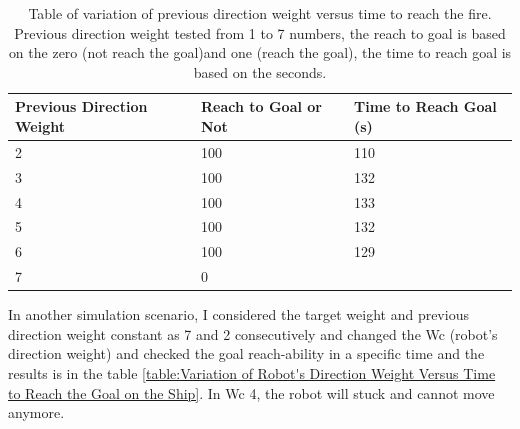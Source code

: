 \begin{table}[ht!]
\centering
    \begin{tabular}{ m{3cm} m{5cm} m{5cm} } 
    \toprule
    \toprule
    \textbf{Previous Direction Weight} & \textbf{Reach to Goal or Not} & \textbf{Time to Reach Goal (s)} \\
    \midrule
    2      & 100       & 110   \\[1.3ex]
    3      & 100     & 132   \\[1.3ex]
    4      & 100     & 133   \\[1.3ex]
    5      & 100    & 132   \\[1.3ex]
    6     & 100     & 129     \\[1.3ex]
    7     & 0     &      \\[1.3ex]
 
    \bottomrule
    \bottomrule
\end{tabular}
\caption[Variation of Previous Direction Weight Versus Time to Reach the fire on a Ship's Deck]{Table of variation of previous direction weight versus time to reach the fire. Previous direction weight tested from 1 to 7 numbers, the reach to goal is based on the zero (not reach the goal)and one (reach the goal), the time to reach goal is based on the seconds. }
\label{table:Variation of Previous Direction Weight Versus Time to Reach the Goal on the Ship}
\end{table} 
\noindent In another simulation scenario, I considered the target weight and previous direction weight constant as 7 and 2 consecutively and changed the Wc (robot's direction weight) and checked the goal reach-ability in a specific time and the results is in the table \ref{table:Variation of Robot's Direction Weight Versus Time to Reach the Goal on the Ship}. In Wc 4, the robot will stuck and cannot move anymore. 

